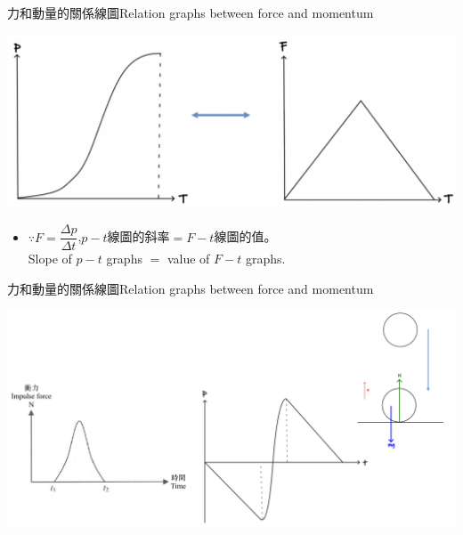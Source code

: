 \documentclass[beamer=true]{standalone}
\begin{document}

\begin{frame}{力和動量的關係線圖Relation graphs between force and momentum}
    \par{\par\centering
        \includegraphics[width=\textwidth]{assets/a8d214ae.png}
        \par}
    \bigskip
    \begin{itemize}
        \item []$\because F=\dfrac{\Delta p}{\Delta t}$,\hspace{1em}$p-t$線圖的斜率$=$$F-t$線圖的值。\\Slope of $p-t$ graphs $=$ value of $F-t$ graphs.
    \end{itemize}
\end{frame}





\begin{frame}{力和動量的關係線圖Relation graphs between force and momentum}
    \par{\par\centering
        \includegraphics[width=\textwidth]{assets/f231d810.png}
        \par}
\end{frame}
\end{document}
